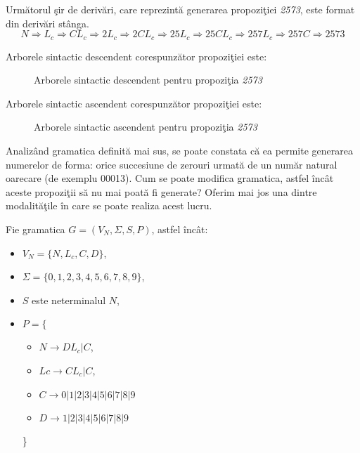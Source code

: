 Următorul şir de derivări, care reprezintă generarea propoziţiei \textit{2573}, este format din derivări stânga.
\[ N \Rightarrow L_c \Rightarrow CL_c \Rightarrow 2L_c \Rightarrow2CL_c \Rightarrow25L_c \Rightarrow25CL_c \Rightarrow 257L_c \Rightarrow 257C \Rightarrow 2573 \]

Arborele sintactic descendent corespunzător propoziţiei este:

\begin{figure}[H]
\centering
{} 
\caption{Arborele sintactic descendent pentru propoziţia \textit{2573}}
\end{figure}

Arborele sintactic ascendent corespunzător propoziţiei este:

\begin{figure}[H]
\centering
{}
\caption{Arborele sintactic ascendent pentru propoziţia \textit{2573}}
\end{figure}

Analizând gramatica definită mai sus, se poate constata că ea permite generarea numerelor de forma: orice succesiune de zerouri urmată de un număr natural oarecare (de exemplu 00013). Cum se poate modifica gramatica, astfel încât aceste propoziţii să nu mai poată fi generate? Oferim mai jos una dintre modalităţile în care se poate realiza acest lucru.

Fie gramatica $G = (V_{N}, \Sigma, S, P)$, astfel încât:

\begin{itemize}
\item
$V_{N} = \{N,L_c,C,D\}$,
\item
$\Sigma = \{0,1,2,3,4,5,6,7,8,9\}$,
\item
$S$ este neterminalul $N$, 
\item
$P = \{$
\begin{itemize}
\item
$N \rightarrow D L_c| C$,
\item
$Lc \rightarrow CL_c | C$,
\item
$C \rightarrow 0|1|2|3|4|5|6|7|8|9$
\item
$D \rightarrow 1|2|3|4|5|6|7|8|9$
\end{itemize}
\}
\end{itemize}

